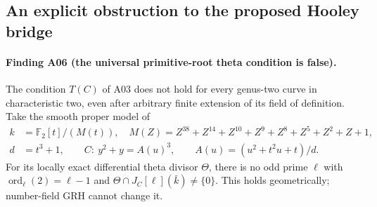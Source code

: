 \documentclass[11pt,a4paper]{article}
\begin{document}
\subsection{An explicit obstruction to the proposed Hooley bridge}

\paragraph{Finding A06 (the universal primitive-root theta condition is false).}
The condition $T(C)$ of A03 does not hold for every genus-two curve in
characteristic two, even after arbitrary finite extension of its field of
definition. Take the smooth proper model of
\[
 \begin{split}
 k&=\mathbb F_2[t]/(M(t)),\quad
 M(Z)=Z^{38}+Z^{14}+Z^{10}+Z^9+Z^8+Z^5+Z^2+Z+1,\\
 d&=t^3+1,\qquad
 C:\ y^2+y=A(u)^3,\qquad
 A(u)=(u^2+t^2u+t)/d.
 \end{split} \tag{A06.1}
\]
For its locally exact differential theta divisor $\Theta$, there is no
odd prime $\ell$ with $\operatorname{ord}_\ell(2)=\ell-1$ and
$\Theta\cap J_C[\ell](\bar k)\ne\{0\}$. This holds geometrically;
number-field GRH cannot change it.
\end{document}
